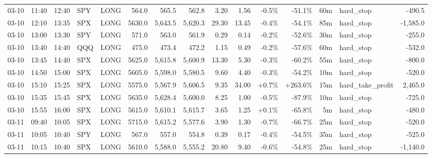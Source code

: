 \documentclass[11pt,a4paper,twoside]{article}
\begin{document}
\begin{landscape}
\begin{center}
\begin{longtable}{>{\color{txtmain}}l l l l l r r r r r r r r >{\color{txtmain}}l r}
03-10 & 11:40 & 12:40 & SPY & LONG & 564.0 & 565.5 & 562.8 & 3.20 & 1.56 & \textcolor{lossred}{-0.5\%} & \textcolor{lossred}{-51.1\%} & 60m & hard\_stop & \textcolor{lossred}{-490.5} \\
03-10 & 12:10 & 13:35 & SPX & LONG & 5630.0 & 5,643.5 & 5,620.3 & 29.30 & 13.45 & \textcolor{lossred}{-0.4\%} & \textcolor{lossred}{-54.1\%} & 85m & hard\_stop & \textcolor{lossred}{-1,585.0} \\
03-10 & 13:00 & 13:30 & SPY & LONG & 571.0 & 563.0 & 561.9 & 0.29 & 0.14 & \textcolor{lossred}{-0.2\%} & \textcolor{lossred}{-52.6\%} & 30m & hard\_stop & \textcolor{lossred}{-255.0} \\
03-10 & 13:40 & 14:40 & QQQ & LONG & 475.0 & 473.4 & 472.2 & 1.15 & 0.49 & \textcolor{lossred}{-0.2\%} & \textcolor{lossred}{-57.6\%} & 60m & hard\_stop & \textcolor{lossred}{-532.0} \\
03-10 & 13:45 & 14:40 & SPX & LONG & 5625.0 & 5,615.8 & 5,600.9 & 13.30 & 5.30 & \textcolor{lossred}{-0.3\%} & \textcolor{lossred}{-60.2\%} & 55m & hard\_stop & \textcolor{lossred}{-800.0} \\
03-10 & 14:50 & 15:00 & SPX & LONG & 5605.0 & 5,598.0 & 5,580.5 & 9.60 & 4.40 & \textcolor{lossred}{-0.3\%} & \textcolor{lossred}{-54.2\%} & 10m & hard\_stop & \textcolor{lossred}{-520.0} \\
03-10 & 15:10 & 15:25 & SPX & LONG & 5575.0 & 5,567.9 & 5,606.5 & 9.35 & 34.00 & \textcolor{wingreen}{+0.7\%} & \textcolor{wingreen}{+263.6\%} & 15m & hard\_take\_profit & \textcolor{wingreen}{2,465.0} \\
03-10 & 15:35 & 15:45 & SPX & LONG & 5635.0 & 5,628.4 & 5,600.0 & 8.25 & 1.00 & \textcolor{lossred}{-0.5\%} & \textcolor{lossred}{-87.9\%} & 10m & hard\_stop & \textcolor{lossred}{-725.0} \\
03-10 & 15:55 & 16:00 & SPX & LONG & 5615.0 & 5,610.1 & 5,615.7 & 3.65 & 1.25 & \textcolor{wingreen}{+0.1\%} & \textcolor{lossred}{-65.8\%} & 5m & hard\_stop & \textcolor{lossred}{-480.0} \\
03-11 & 09:40 & 10:05 & SPX & LONG & 5715.0 & 5,615.2 & 5,577.6 & 3.90 & 1.30 & \textcolor{lossred}{-0.7\%} & \textcolor{lossred}{-66.7\%} & 25m & hard\_stop & \textcolor{lossred}{-520.0} \\
03-11 & 10:05 & 10:40 & SPY & LONG & 567.0 & 557.0 & 554.8 & 0.39 & 0.17 & \textcolor{lossred}{-0.4\%} & \textcolor{lossred}{-54.5\%} & 35m & hard\_stop & \textcolor{lossred}{-525.0} \\
03-11 & 10:15 & 10:40 & SPX & LONG & 5610.0 & 5,588.0 & 5,555.2 & 20.80 & 9.40 & \textcolor{lossred}{-0.6\%} & \textcolor{lossred}{-54.8\%} & 25m & hard\_stop & \textcolor{lossred}{-1,140.0} \\

\end{longtable}
\end{center}
\end{landscape}
\end{document}
